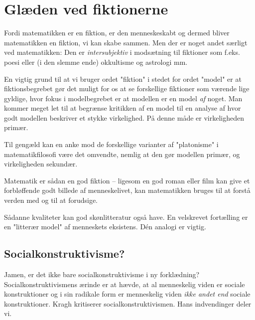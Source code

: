 \chapter{Glæden ved fiktionerne}

 Fordi matematikken er en fiktion, er den menneskeskabt og dermed bliver matematikken en fiktion, vi kan skabe sammen. Men der er noget andet særligt ved matematikken: Den er \emph{intersubjektiv} i modsætning til fiktioner som f.eks. poesi eller (i den slemme ende) okkultisme og astrologi mm.
 
 En vigtig grund til at vi bruger ordet "fiktion" i stedet for ordet "model" er at fiktionsbegrebet gør det muligt for os at se forskellige fiktioner som værende lige gyldige, hvor fokus i modelbegrebet er at modellen er en model \emph{af} noget. Man kommer meget let til at begrænse kritikken af en model til en analyse af hvor godt modellen beskriver et stykke virkelighed. På denne måde er virkeligheden primær.
 
 Til gengæld kan en anke mod de forskellige varianter af "platonisme" i matematikfilosofi være det omvendte, nemlig at den gør modellen primær, og virkeligheden sekundær.
 
 Matematik er sådan en god fiktion – ligesom en god roman eller film kan give et forbløffende godt billede af menneskelivet, kan matematikken bruges til at forstå verden med og til at forudsige. 

Sådanne kvaliteter kan god skønlitteratur også have. En velskrevet fortælling er en "litterær model" af menneskets eksistens. Dén analogi er vigtig.

\section{Socialkonstruktivisme?}

Jamen, er det ikke bare socialkonstruktivisme i ny forklædning? Socialkonstruktivismens ærinde er at hævde, at al menneskelig viden er sociale konstruktioner og i sin radikale form er menneskelig viden \emph{ikke andet end} sociale konstruktioner. Kragh \cite{kragh} kritiserer socialkonstruktivismen. Hans indvendinger deler vi.

